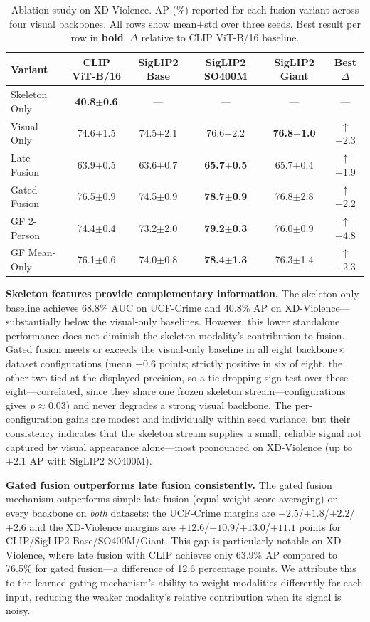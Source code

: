 \documentclass[sigconf]{acmart}
\begin{document}
\begin{table}[t]
\caption{Ablation study on XD-Violence. AP (\%) reported for each fusion variant across four visual backbones. All rows show mean$\pm$std over three seeds. Best result per row in \textbf{bold}. $\Delta$ relative to CLIP ViT-B/16 baseline.}
\label{tab:xd-ablation}
\begin{tabular}{l c c c c c}
\toprule
Variant & CLIP ViT-B/16 & SigLIP2 Base & SigLIP2 SO400M & SigLIP2 Giant & Best $\Delta$ \\
\midrule
Skeleton Only & \textbf{40.8$\pm$0.6} & --- & --- & --- & --- \\
Visual Only & 74.6$\pm$1.5 & 74.5$\pm$2.1 & 76.6$\pm$2.2 & \textbf{76.8$\pm$1.0} & $\uparrow$+2.3 \\
\midrule
Late Fusion & 63.9$\pm$0.5 & 63.6$\pm$0.7 & \textbf{65.7$\pm$0.5} & 65.7$\pm$0.4 & $\uparrow$+1.9 \\
Gated Fusion & 76.5$\pm$0.9 & 74.5$\pm$0.9 & \textbf{78.7$\pm$0.9} & 76.8$\pm$2.8 & $\uparrow$+2.2 \\
GF 2-Person & 74.4$\pm$0.4 & 73.2$\pm$2.0 & \textbf{79.2$\pm$0.3} & 76.0$\pm$0.9 & $\uparrow$+4.8 \\
GF Mean-Only & 76.1$\pm$0.6 & 74.0$\pm$0.8 & \textbf{78.4$\pm$1.3} & 76.3$\pm$1.4 & $\uparrow$+2.3 \\
\bottomrule
\end{tabular}
\end{table}

\textbf{Skeleton features provide complementary information.} The skeleton-only baseline achieves 68.8\% AUC on UCF-Crime and 40.8\% AP on XD-Violence---substantially below the visual-only baselines. However, this lower standalone performance does not diminish the skeleton modality's contribution to fusion. Gated fusion meets or exceeds the visual-only baseline in all eight backbone$\times$dataset configurations (mean $+0.6$ points; strictly positive in six of eight, the other two tied at the displayed precision, so a tie-dropping sign test over these eight---correlated, since they share one frozen skeleton stream---configurations gives $p\approx0.03$) and never degrades a strong visual backbone. The per-configuration gains are modest and individually within seed variance, but their consistency indicates that the skeleton stream supplies a small, reliable signal not captured by visual appearance alone---most pronounced on XD-Violence (up to $+2.1$ AP with SigLIP2 SO400M).

\textbf{Gated fusion outperforms late fusion consistently.} The gated fusion mechanism outperforms simple late fusion (equal-weight score averaging) on every backbone on \emph{both} datasets: the UCF-Crime margins are $+2.5$/$+1.8$/$+2.2$/$+2.6$ and the XD-Violence margins are $+12.6$/$+10.9$/$+13.0$/$+11.1$ points for CLIP/SigLIP2 Base/SO400M/Giant. This gap is particularly notable on XD-Violence, where late fusion with CLIP achieves only 63.9\% AP compared to 76.5\% for gated fusion---a difference of 12.6 percentage points. We attribute this to the learned gating mechanism's ability to weight modalities differently for each input, reducing the weaker modality's relative contribution when its signal is noisy.
\end{document}

